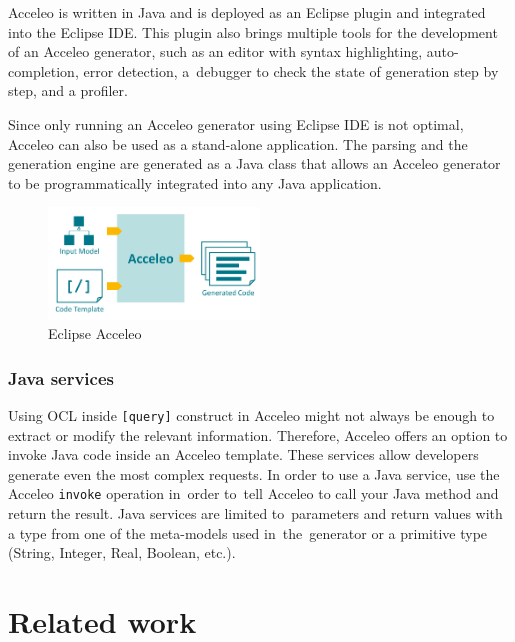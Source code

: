 Acceleo is written in Java and is deployed as an Eclipse plugin and integrated into the Eclipse IDE. This plugin also brings multiple tools for the development of an Acceleo generator, such as an editor with syntax highlighting, auto-completion, error detection, a~debugger to check the state of generation step by step, and a profiler.

Since only running an Acceleo generator using Eclipse IDE is not optimal, Acceleo can also be used as a stand-alone application. The parsing and the generation engine are generated as a Java class that allows an Acceleo generator to be programmatically integrated into any Java application.

\begin{figure}[H]
\centering  
\includegraphics[width=0.50\textwidth]{obrazky-figures/acceleo.png}
\caption{Eclipse Acceleo \protect\footnotemark }
\end{figure}


\subsection*{Java services}

Using OCL inside \texttt{[query]} construct in Acceleo might not always be enough to extract or modify the relevant information. Therefore, Acceleo offers an option to invoke Java code inside an Acceleo template. These services allow developers generate even the most complex requests. In order to use a Java service, use the Acceleo \texttt{invoke} operation in~order to~tell Acceleo to call your Java method and return the result. Java services are limited to~parameters and return values with a type from one of the meta-models used in~the~generator or a primitive type (String, Integer, Real, Boolean, etc.).


\chapter{Related work}
\label{chap:existing}


